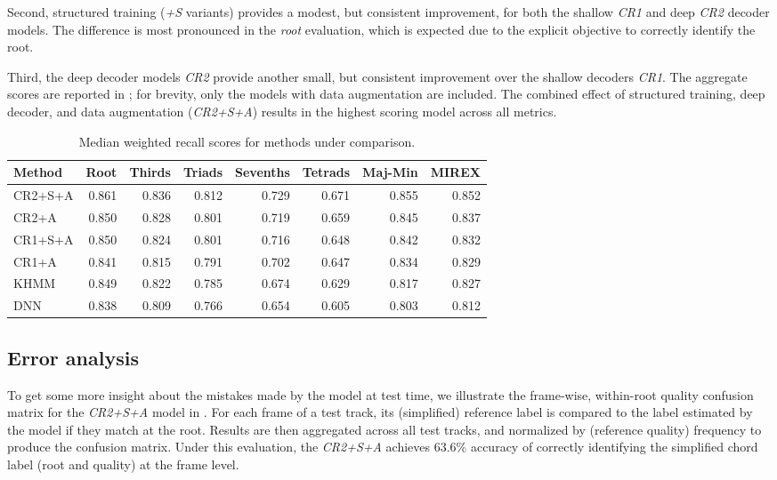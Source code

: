 \documentclass{article}
\begin{document}
Second, structured training (\emph{+S} variants) provides a modest, but consistent improvement, for both the shallow \emph{CR1} and deep \emph{CR2} decoder models.
The difference is most pronounced in the \emph{root} evaluation, which is expected due to the explicit objective to correctly identify the root.

Third, the deep decoder models \emph{CR2} provide another small, but consistent improvement over the shallow decoders \emph{CR1}.
The aggregate scores are reported in ; for brevity, only the models with data augmentation are included.
The combined effect of structured training, deep decoder, and data augmentation (\emph{CR2+S+A}) results in the highest scoring model across all metrics.

\begin{table}
    \centering
    \caption{Median weighted recall scores for methods under comparison.\label{tab:results}}
    \begin{tabular}{lrrrrrrr}
        \toprule
        Method  & Root & Thirds & Triads & Sevenths & Tetrads & Maj-Min & MIREX\\
        \midrule
        CR2+S+A & 0.861 & 0.836 & 0.812 & 0.729 & 0.671 & 0.855 & 0.852\\
        CR2+A   & 0.850 & 0.828 & 0.801 & 0.719 & 0.659 & 0.845 & 0.837\\
        CR1+S+A & 0.850 & 0.824 & 0.801 & 0.716 & 0.648 & 0.842 & 0.832\\
        CR1+A   & 0.841 & 0.815 & 0.791 & 0.702 & 0.647 & 0.834 & 0.829\\
        \midrule
        KHMM~\cite{cho2014improved}    & 0.849 & 0.822 & 0.785 & 0.674 & 0.629 & 0.817 & 0.827\\
        DNN~\cite{humphrey2015four}     & 0.838 & 0.809 & 0.766 & 0.654 & 0.605 & 0.803 & 0.812\\
        \bottomrule
    \end{tabular}
\end{table}
\subsection{Error analysis}

To get some more insight about the mistakes made by the model at test time, we illustrate the frame-wise, within-root quality confusion matrix for the \emph{CR2+S+A} model in .
For each frame of a test track, its (simplified) reference label is compared to the label estimated by the model if they match at the root.
Results are then aggregated across all test tracks, and normalized by (reference quality) frequency to produce the confusion matrix.
Under this evaluation, the \emph{CR2+S+A} achieves 63.6\% accuracy of correctly identifying the simplified chord label (root and quality) at the frame level.
\end{document}
